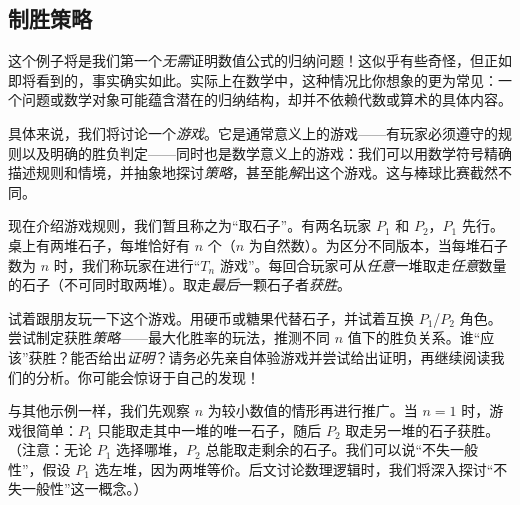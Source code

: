 \subsection{制胜策略}

这个例子将是我们第一个\emph{无需}证明数值公式的归纳问题！这似乎有些奇怪，但正如即将看到的，事实确实如此。实际上在数学中，这种情况比你想象的更为常见：一个问题或数学对象可能蕴含潜在的归纳结构，却并不依赖代数或算术的具体内容。

具体来说，我们将讨论一个\emph{游戏}。它是通常意义上的游戏——有玩家必须遵守的规则以及明确的胜负判定——同时也是数学意义上的游戏：我们可以用数学符号精确描述规则和情境，并抽象地探讨\emph{策略}，甚至能\emph{解}出这个游戏。这与棒球比赛截然不同。

现在介绍游戏规则，我们暂且称之为``取石子''。有两名玩家 $P_1$ 和 $P_2$，$P_1$ 先行。桌上有两堆石子，每堆恰好有 $n$ 个（$n$ 为自然数）。为区分不同版本，当每堆石子数为 $n$ 时，我们称玩家在进行``$T_n$ 游戏''。每回合玩家可从\emph{任意}一堆取走\emph{任意}数量的石子（不可同时取两堆）。取走\emph{最后}一颗石子者\emph{获胜}。

试着跟朋友玩一下这个游戏。用硬币或糖果代替石子，并试着互换 $P_1$/$P_2$ 角色。尝试制定获胜\emph{策略}——最大化胜率的玩法，推测不同 $n$ 值下的胜负关系。谁``应该''获胜？能否给出\emph{证明}？请务必先亲自体验游戏并尝试给出证明，再继续阅读我们的分析。你可能会惊讶于自己的发现！

与其他示例一样，我们先观察 $n$ 为较小数值的情形再进行推广。当 $n = 1$ 时，游戏很简单：$P_1$ 只能取走其中一堆的唯一石子，随后 $P_2$ 取走另一堆的石子获胜。（注意：无论 $P_1$ 选择哪堆，$P_2$ 总能取走剩余的石子。我们可以说``不失一般性''，假设 $P_1$ 选左堆，因为两堆等价。后文讨论数理逻辑时，我们将深入探讨``不失一般性''这一概念。）

\begin{center}
\end{center}

